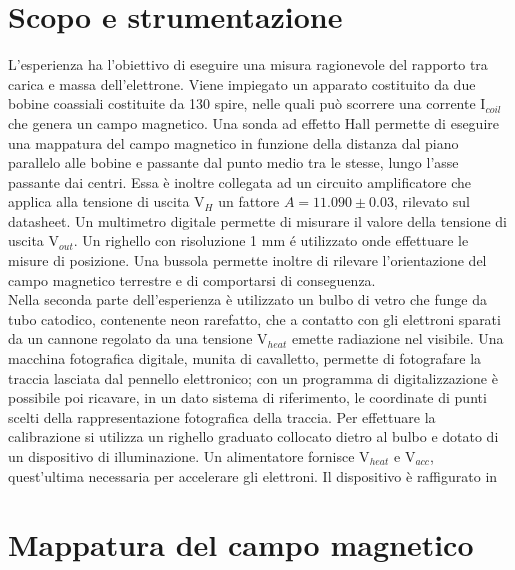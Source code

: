 \section{Scopo e strumentazione}

L'esperienza ha l'obiettivo di eseguire una misura ragionevole del rapporto tra carica e massa dell'elettrone. Viene impiegato un apparato costituito da due bobine coassiali costituite da 130 spire, nelle quali può scorrere una corrente I$_{coil}$ che genera un campo magnetico. Una sonda ad effetto Hall permette di eseguire una mappatura del campo magnetico in funzione della distanza dal piano parallelo alle bobine e passante dal punto medio tra le stesse, lungo l'asse passante dai centri. Essa è inoltre collegata ad un circuito amplificatore che applica alla tensione di uscita V$_H$ un fattore $A = 11.090 \pm 0.03$, rilevato sul datasheet. Un multimetro digitale permette di misurare il valore della tensione di uscita V$_{out}$. Un righello con risoluzione 1 mm é utilizzato onde effettuare le misure di posizione. Una bussola permette inoltre di rilevare l'orientazione del campo magnetico terrestre e di comportarsi di conseguenza.\\ Nella seconda parte dell'esperienza è utilizzato un bulbo di vetro che funge da tubo catodico, contenente neon rarefatto, che a contatto con gli elettroni sparati da un cannone regolato da una tensione V$_{heat }$ emette radiazione nel visibile. Una macchina fotografica digitale, munita di cavalletto, permette di fotografare la traccia lasciata dal pennello elettronico; con un programma di digitalizzazione è possibile poi ricavare, in un dato sistema di riferimento, le coordinate di punti scelti della rappresentazione fotografica della traccia. Per effettuare la calibrazione si utilizza un righello graduato collocato dietro al bulbo e dotato di un dispositivo di illuminazione. Un alimentatore fornisce V$_{heat}$ e V$_{acc}$, quest'ultima necessaria per accelerare gli elettroni. Il dispositivo è raffigurato in 
\section{Mappatura del campo magnetico}

